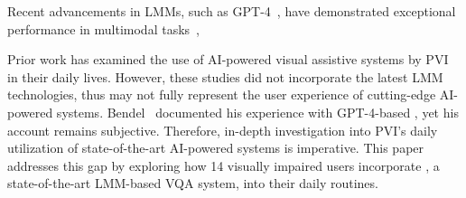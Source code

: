 Recent advancements in LMMs, such as GPT-4~\cite{achiam2023gpt}, have demonstrated exceptional performance in multimodal tasks~\cite{yu2023mm}, 




Prior work has examined the use of AI-powered visual assistive systems by PVI in their daily lives. However, these studies did not incorporate the latest LMM technologies, thus may not fully represent the user experience of cutting-edge AI-powered systems. Bendel~\cite{bendel2024can} documented his experience with GPT\mbox{-}4\mbox{-}based \bma, yet his account remains subjective. Therefore, in-depth investigation into PVI's daily utilization of state-of-the-art AI-powered systems is imperative. 
This paper addresses this gap by exploring how 14 visually impaired users incorporate \bma, a state-of-the-art LMM-based VQA system, into their daily routines. 


